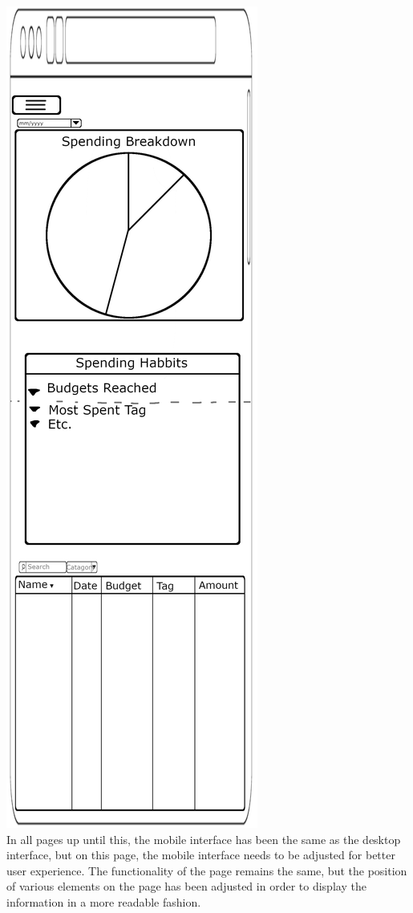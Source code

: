\documentclass[12pt]{article}
\begin{document}
\includegraphics[scale=0.5]{StatsPageMobile.png}\\
In all pages up until this, the mobile interface has been the same as the desktop interface, but on this page, the mobile interface needs to be adjusted for better user experience. The functionality of the page remains the same, but the position of various elements on the page has been adjusted in order to display the information in a more readable fashion.\\
\end{document}
